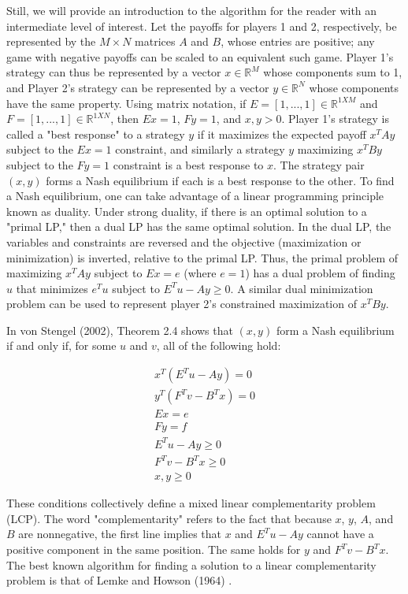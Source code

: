 \documentclass{article}
\begin{document}
Still, we will provide an introduction to the algorithm for the reader with an intermediate level of interest. Let the payoffs for players 1 and 2, respectively, be represented by the $M \times N$ matrices $A$ and $B$, whose entries are positive; any game with negative payoffs can be scaled to an equivalent such game. Player 1's strategy can thus be represented by a vector $x \in \mathbb{R}^M$ whose components sum to 1, and Player 2's strategy can be represented by a vector $y \in \mathbb{R}^N$ whose components have the same property. Using matrix notation, if $E=[1, ..., 1]\in\mathbb{R}^{1XM}$ and $F=[1, ..., 1]\in\mathbb{R}^{1XN}$, then $Ex=1$, $Fy=1$, and $x,y>0$.  Player 1's strategy is called a "best response" to a strategy $y$ if it maximizes the expected payoff $x^TAy$ subject to the $Ex=1$ constraint, and similarly a strategy $y$ maximizing $x^TBy$ subject to the $Fy=1$ constraint is a best response to $x$. The strategy pair $(x,y)$ forms a Nash equilibrium if each is a best response to the other. To find a Nash equilibrium, one can take advantage of a linear programming principle known as duality. Under strong duality, if there is an optimal solution to a "primal LP," then a dual LP has the same optimal solution. In the dual LP, the variables and constraints are reversed and the objective (maximization or minimization) is inverted, relative to the primal LP. Thus, the primal problem of maximizing $x^TAy$ subject to $Ex=e$ (where $e=1$) has a dual problem of finding $u$ that minimizes $e^Tu$ subject to $E^Tu-Ay \geq 0$. A similar dual minimization problem can be used to represent player 2's constrained maximization of $x^TBy$.

In von Stengel (2002), Theorem 2.4 shows that $(x,y)$ form a Nash equilibrium if and only if, for some $u$ and $v$, all of the following hold:

\begin{align*}
x^T(E^Tu-Ay) = 0 \\
y^T(F^Tv-B^Tx) = 0 \\
Ex = e \\
Fy = f\\
E^T u - A y \geq 0 \\
F^Tv - B^Tx \geq 0 \\
x, y \geq 0
\end{align*}

\noindent These conditions collectively define a mixed linear complementarity problem (LCP). The word "complementarity" refers to the fact that because $x$, $y$, $A$, and $B$ are nonnegative, the first line implies that $x$ and $E^Tu-Ay$ cannot have a positive component in the same position. The same holds for $y$ and $F^Tv-B^Tx$. The best known algorithm for finding a solution to a linear complementarity problem is that of Lemke and Howson (1964) \cite{lemkehowson}. 
\end{document}
